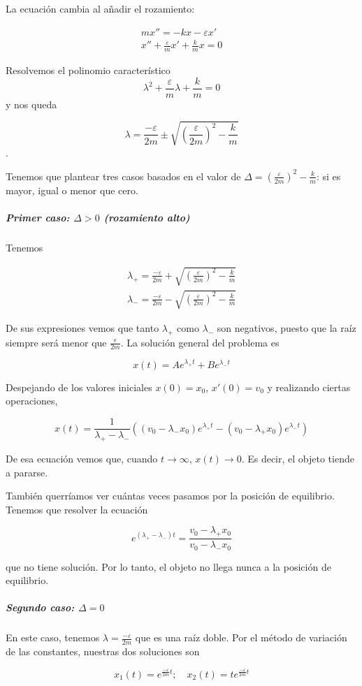 \documentclass{mathnotes}
\begin{document}
La ecuación cambia al añadir el rozamiento:

\begin{gather} mx'' = -kx - εx' \nonumber \\
x'' + \frac{ε}{m}x' + \frac{k}{m}x = 0
\end{gather}

Resolvemos el polinomio característico \[ λ^2 + \frac{ε}{m}λ + \frac{k}{m} = 0 \] y nos queda

\[ λ = \frac{-ε}{2m} \pm \sqrt{\left(\frac{ε}{2m}\right)^2 - \frac{k}{m}} \].

Tenemos que plantear tres casos basados en el valor de $Δ =\left(\frac{ε}{2m}\right)^2 - \frac{k}{m}$: si es mayor, igual o menor que cero.

\subparagraph{Primer caso: $Δ > 0$ (rozamiento alto)}

Tenemos 

\begin{gather*}
λ_+ = \frac{-ε}{2m} + \sqrt{\left(\frac{ε}{2m}\right)^2 - \frac{k}{m}} \\
λ_- = \frac{-ε}{2m} - \sqrt{\left(\frac{ε}{2m}\right)^2 - \frac{k}{m}} 
\end{gather*}

De sus expresiones vemos que tanto $λ_+$ como $λ_-$ son negativos, puesto que la raíz siempre será menor que $\frac{\epsilon}{2m}$. La solución general del problema es 

\[ x(t) = Ae^{λ_+t} + Be^{λ_-t} \]

Despejando de los valores iniciales $x(0) = x_0$, $x'(0) = v_0$ y realizando ciertas operaciones,

\[ x(t) = \frac{1}{λ_+ - λ_-}\left((v_0-λ_-x_0)e^{λ_+t} - (v_0-λ_+x_0)e^{λ_-t}\right) \]

De esa ecuación vemos que, cuando $t\to ∞$, $x(t) \to 0$. Es decir, el objeto tiende a pararse.

También querríamos ver cuántas veces pasamos por la posición de equilibrio. Tenemos que resolver la ecuación

\[ e^{(λ_+ - λ_-)t} = \frac{v_0-λ_+x_0}{v_0-λ_-x_0} \]

que no tiene solución. Por lo tanto, el objeto no llega nunca a la posición de equilibrio.

\subparagraph{Segundo caso: $Δ=0$}

En este caso, tenemos $λ=\frac{-ε}{2m}$ que es una raíz doble. Por el método de variación de las constantes, nuestras dos soluciones son

\[ x_1(t) = e^{\frac{-ε}{2m}t};\quad x_2(t) = te^{\frac{-ε}{2m}t} \]
\end{document}
